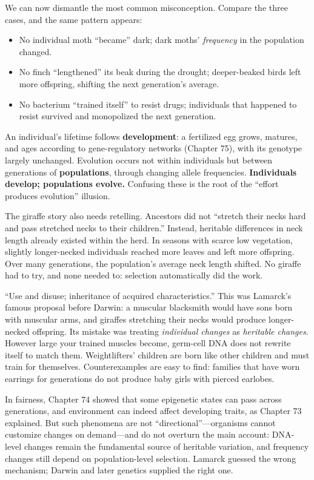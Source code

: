 We can now dismantle the most common misconception. Compare the three cases, and the same pattern appears:

\begin{itemize}[itemsep=2pt]
\item No individual moth ``became'' dark; dark moths' \emph{frequency} in the population changed.
\item No finch ``lengthened'' its beak during the drought; deeper-beaked birds left more offspring, shifting the next generation's average.
\item No bacterium ``trained itself'' to resist drugs; individuals that happened to resist survived and monopolized the next generation.
\end{itemize}

An individual's lifetime follows \textbf{development}: a fertilized egg grows, matures, and ages according to gene-regulatory networks (Chapter 75), with its genotype largely unchanged. Evolution occurs not within individuals but between generations of \textbf{populations}, through changing allele frequencies. \textbf{Individuals develop; populations evolve.} Confusing these is the root of the ``effort produces evolution'' illusion.

The giraffe story also needs retelling. Ancestors did not ``stretch their necks hard and pass stretched necks to their children.'' Instead, heritable differences in neck length already existed within the herd. In seasons with scarce low vegetation, slightly longer-necked individuals reached more leaves and left more offspring. Over many generations, the population's average neck length shifted. No giraffe had to try, and none needed to: selection automatically did the work.

\begin{wuqu}
``Use and disuse; inheritance of acquired characteristics.'' This was Lamarck's famous proposal before Darwin: a muscular blacksmith would have sons born with muscular arms, and giraffes stretching their necks would produce longer-necked offspring. Its mistake was treating \emph{individual changes} as \emph{heritable changes}. However large your trained muscles become, germ-cell DNA does not rewrite itself to match them. Weightlifters' children are born like other children and must train for themselves. Counterexamples are easy to find: families that have worn earrings for generations do not produce baby girls with pierced earlobes.

In fairness, Chapter 74 showed that some epigenetic states can pass across generations, and environment can indeed affect developing traits, as Chapter 73 explained. But such phenomena are not ``directional''---organisms cannot customize changes on demand---and do not overturn the main account: DNA-level changes remain the fundamental source of heritable variation, and frequency changes still depend on population-level selection. Lamarck guessed the wrong mechanism; Darwin and later genetics supplied the right one.
\end{wuqu}

